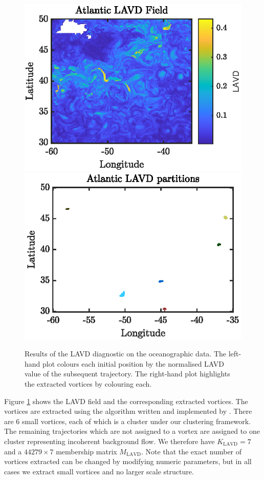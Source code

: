 \documentclass[a4paper, fontsize=12pt]{article}
\begin{document}
\begin{figure}
\begin{center}
	\includegraphics[scale=1]{../figures/atlantic_lavd.eps}%
	\includegraphics[scale=1]{../figures/atlantic_member_lavd.eps}
	\caption{Results of the LAVD diagnostic on the oceanographic data. The left-hand plot colours each initial position by the normalised LAVD value of the subsequent trajectory. The right-hand plot highlights the extracted vortices by colouring each.}
	\label{fig:atlantic_lavd}
\end{center}
\end{figure}

Figure \ref{fig:atlantic_lavd} shows the LAVD field and the corresponding extracted vortices. The vortices are extracted using the algorithm written and implemented by \cite{haller_2016_lavd}. There are 6 small vortices, each of which is a cluster under our clustering framework. The remaining trajectories which are not assigned to a vortex are assigned to one cluster representing incoherent background flow. We therefore have \(K_{\text{LAVD}} = 7\) and a \(44279\times 7\) membership matrix \(M_{\text{LAVD}}\). Note that the exact number of vortices extracted can be changed by modifying numeric parameters, but in all cases we extract small vortices and no larger scale structure. 
\end{document}
